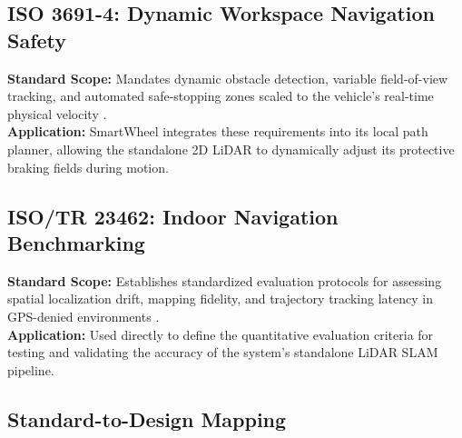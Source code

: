 \documentclass[12pt,a4paper]{report}
\begin{document}
\subsection{ISO 3691-4: Dynamic Workspace Navigation Safety}
\textbf{Standard Scope:} Mandates dynamic obstacle detection, variable field-of-view tracking, and automated safe-stopping zones scaled to the vehicle's real-time physical velocity \cite{iso3691_4}.\\
\textbf{Application:} SmartWheel integrates these requirements into its local path planner, allowing the standalone 2D LiDAR to dynamically adjust its protective braking fields during motion.

\subsection{ISO/TR 23462: Indoor Navigation Benchmarking}
\textbf{Standard Scope:} Establishes standardized evaluation protocols for assessing spatial localization drift, mapping fidelity, and trajectory tracking latency in GPS-denied environments \cite{isotr23462}.\\
\textbf{Application:} Used directly to define the quantitative evaluation criteria for testing and validating the accuracy of the system's standalone LiDAR SLAM pipeline.
\subsection{Standard-to-Design Mapping}
\end{document}

